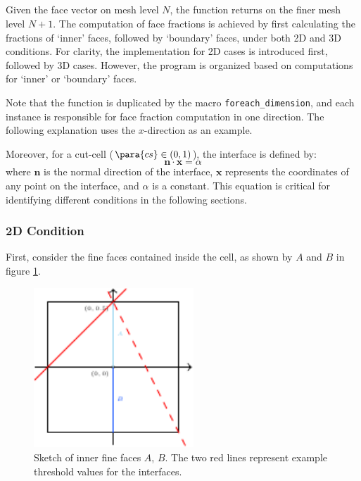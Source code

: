 \subsection{}
Given the face vector  on mesh level $N$, the function  returns  on the finer mesh level $N+1$. The computation of face fractions is achieved by first calculating the fractions of `inner' faces, followed by `boundary' faces, under both 2D and 3D conditions. For clarity, the implementation for 2D cases is introduced first, followed by 3D cases. However, the program is organized based on computations for `inner' or `boundary' faces.

Note that the function is duplicated by the macro \texttt{foreach\_dimension}, and each instance is responsible for face fraction computation in one direction. The following explanation uses the $x$-direction as an example.

Moreover, for a cut-cell ($\para{cs} \in (0,1)$), the interface is defined by:
\begin{equation}\label{equ:embed-tree-interface}
    \mathbf{n} \cdot \mathbf{x} = \alpha
\end{equation}
where $\mathbf{n}$ is the normal direction of the interface, $\mathbf{x}$ represents the coordinates of any point on the interface, and $\alpha$ is a constant. This equation is critical for identifying different conditions in the following sections.

\subsubsection{2D Condition}
First, consider the fine faces contained inside the cell, as shown by $A$ and $B$ in figure \ref{fig:embed-tree-2Dinner}.

\begin{figure}[ht]
    \centering
    \includegraphics[height=6cm]{./image/embed-tree-h/fs_2D.pdf}
    \caption{Sketch of inner fine faces $A$, $B$. The two red lines represent example threshold values for the interfaces.}
    \label{fig:embed-tree-2Dinner}
\end{figure}

